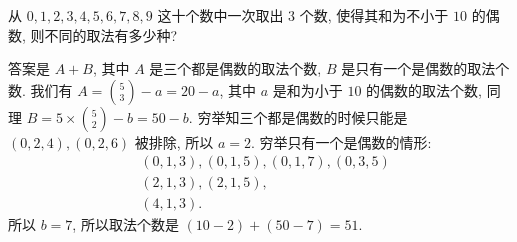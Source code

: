 \begin{prob}
\label{prob:prob-2}
从 $0, 1, 2, 3, 4, 5, 6, 7, 8, 9$ 这十个数中一次取出 $3$ 个数,
使得其和为不小于 $10$ 的偶数, 则不同的取法有多少种?
\end{prob}

\begin{soln}
答案是 $A + B$, 其中 $A$ 是三个都是偶数的取法个数,
$B$ 是只有一个是偶数的取法个数.
我们有 $A = \binom{5}{3} - a = 20 - a$,
其中 $a$ 是和为小于 $10$ 的偶数的取法个数,
同理 $B = 5 \times \binom{5}{2} - b = 50 - b$.
穷举知三个都是偶数的时候只能是 $(0, 2, 4), (0, 2, 6)$ 被排除,
所以 $a = 2$. 穷举只有一个是偶数的情形:
\begin{align*}
& (0, 1, 3), (0, 1, 5), (0, 1, 7), (0, 3, 5) \\
& (2, 1, 3), (2, 1, 5), \\
& (4, 1, 3).
\end{align*}
所以 $b = 7$, 所以取法个数是 $(10 - 2) + (50 - 7) = \boxed{51}$.
\end{soln}
